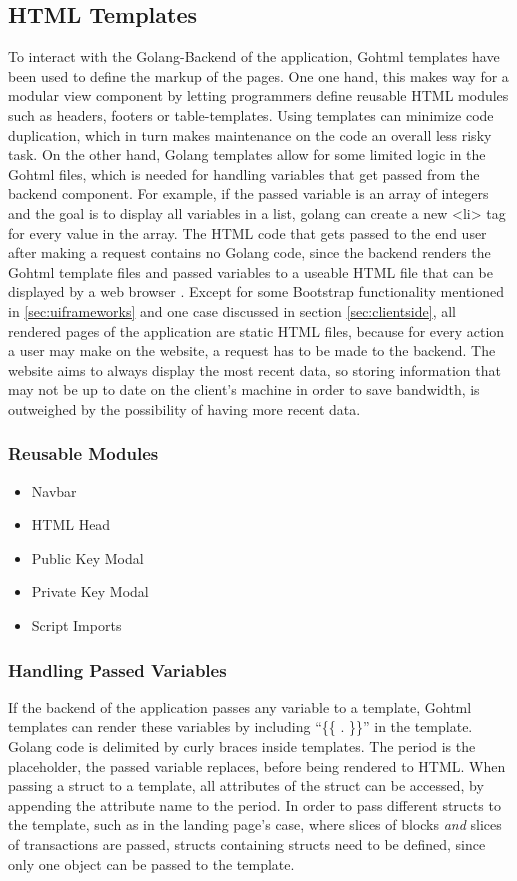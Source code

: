 \subsection{HTML Templates}
To interact with the Golang-Backend of the application, Gohtml templates \cite{template} have been used to define the markup of the pages. One one hand, this makes way for a modular view component by letting programmers define reusable HTML modules such as headers, footers or table-templates. Using templates can minimize code duplication, which in turn makes maintenance on the code an overall less risky task. On the other hand, Golang templates allow for some limited logic in the Gohtml files, which is needed for handling variables that get passed from the backend component. For example, if the passed variable is an array of integers and the goal is to display all variables in a list, golang can create a new <li> tag for every value in the array. The HTML code that gets passed to the end user after making a request contains no Golang code, since the backend renders the Gohtml template files and passed variables to a useable HTML file that can be displayed by a web browser \cite{httppackage}. Except for some Bootstrap \cite{bootstrap} functionality mentioned in \ref{sec:uiframeworks} and one case discussed in section \ref{sec:clientside}, all rendered pages of the application are static HTML files, because for every action a user may make on the website, a request has to be made to the backend. The website aims to always display the most recent data, so storing information that may not be up to date on the client's machine in order to save bandwidth, is outweighed by the possibility of having more recent data. 

\subsubsection{Reusable Modules}
\begin{itemize}
\item{Navbar}
\item{HTML Head}
\item{Public Key Modal}
\item{Private Key Modal}
\item{Script Imports}
\end{itemize}

\subsubsection{Handling Passed Variables}
If the backend of the application passes any variable to a template, Gohtml templates can render these variables by including ``\{\{ . \}\}'' in the template. Golang code is delimited by curly braces inside templates. The period is the placeholder, the passed variable replaces, before being rendered to HTML. When passing a struct to a template, all attributes of the struct can be accessed, by appending the attribute name to the period. In order to pass different structs to the template, such as in the landing page's case, where slices of blocks \emph{and} slices of transactions are passed, structs containing structs need to be defined, since only one object can be passed to the template. 

